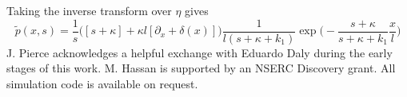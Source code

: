 \documentclass[]{agujournal2018}
\newcommand\be{\begin{equation}}
\newcommand\ee{\end{equation}}
\begin{document}
Taking the inverse transform over $\eta$ gives
\be \tilde{p}(x,s) = \frac{1}{s}\Big( [s+\kappa]+\kappa l[\partial_x + \delta(x)]\Big)\frac{1}{l(s+\kappa + k_1)}\exp\Big(- \frac{s+\kappa}{s+\kappa + k_1}\frac{x}{l}\Big)\ee
\acknowledgments
J. Pierce acknowledges a helpful exchange with Eduardo Daly during the early stages of this work. M. Hassan is supported by an NSERC Discovery grant. All simulation code is available on request.


\end{document}
